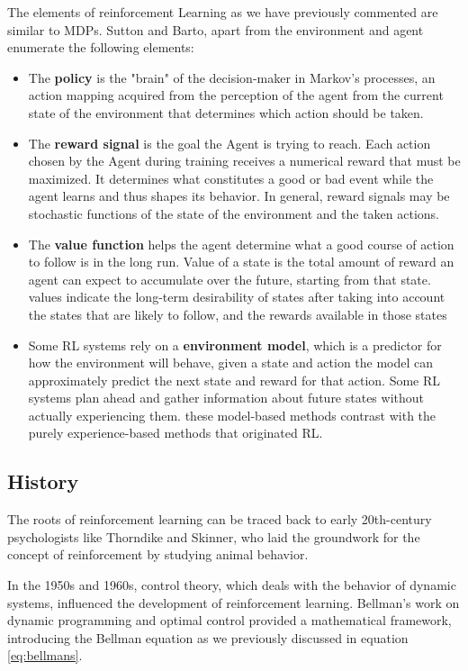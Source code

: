 The elements of reinforcement Learning as we have previously commented are similar to MDPs. Sutton and Barto\cite{}, apart from the environment and agent enumerate the following elements:

\begin{itemize}
    \item The \textbf{policy} is the "brain" of the decision-maker in Markov's processes, an action mapping acquired from the perception of the agent from the current state of the environment that determines which action should be taken.
    
    \item The \textbf{reward signal} is the goal the Agent is trying to reach. Each action chosen by the Agent during training receives a numerical reward that must be maximized. It determines what constitutes a good or bad event while the agent learns and thus shapes its behavior. In general, reward signals may be stochastic functions of the state of the environment and the taken actions.
    
    \item The \textbf{value function} helps the agent determine what a good course of action to follow is in the long run. Value of a state is the total amount of reward an agent can expect to accumulate over the future, starting from that state. values indicate the long-term desirability of states after taking into account the states that are likely to follow, and the rewards available in those states
     
    \item Some RL systems rely on a \textbf{environment model}, which is a predictor for how the environment will behave, given a state and action the model can approximately predict the next state and reward for that action. Some RL systems plan ahead and gather information about future states without actually experiencing them. these model-based methods contrast with the purely experience-based methods that originated RL.
\end{itemize}

\subsection*{History}
The roots of reinforcement learning can be traced back to early 20th-century psychologists like Thorndike\cite{} and Skinner\cite{}, who laid the groundwork for the concept of reinforcement by studying animal behavior.

In the 1950s and 1960s, control theory, which deals with the behavior of dynamic systems, influenced the development of reinforcement learning. Bellman's work on dynamic programming and optimal control provided a mathematical framework, introducing the Bellman equation as we previously discussed in equation \ref{eq:bellmans}.

